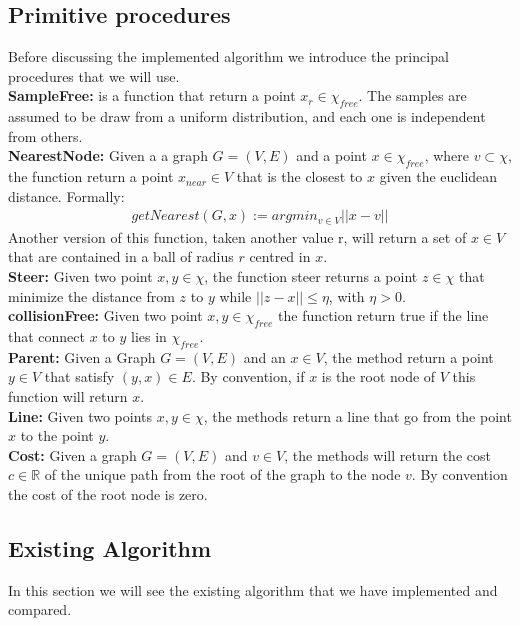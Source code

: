 \documentclass[10pt]{article}
\begin{document}
	\subsection{Primitive procedures}
	Before discussing the implemented algorithm we introduce the principal procedures that we will use.\\
	
	\textbf{SampleFree:} is a function that return a point $x_{r} \in \chi_{free}$. The samples are assumed to be draw from a uniform distribution, and each one is independent from others.\\
	
	
	\textbf{NearestNode:} Given a a graph $G=(V,E)$ and a point $x\in\chi_{free}$, where $v\subset\chi$, the function return a point $x_{near} \in V$ that is the closest to $x$ given the euclidean distance. Formally: 
	\begin{align}
    getNearest (G,x) := argmin_{v \in V} ||x - v|| \nonumber
	\end{align}
	Another version of this function, taken another value r, will return a set of $x\in V$ that are contained in a ball of radius $r$ centred in $x$.\\  
	
	\textbf{Steer:} Given two point $x,y \in \chi$, the function steer returns a point $z \in \chi$ that minimize the distance from $z$ to $y$ while $||z-x|| \le \eta$, with $\eta > 0$. \\
	
	\textbf{collisionFree:} Given two point $x,y \in \chi_{free}$ the function return true if the line that connect $x$ to $y$ lies in $\chi_{free}$.\\
	
	\textbf{Parent:} Given a Graph $G=(V,E)$ and an $x\in V$, the method return a point $y \in V$ that satisfy $(y,x) \in E$. By convention, if $x$ is the root node of $V$ this function will return $x$.\\
	
	\textbf{Line:} Given two points $x,y \in \chi$, the methods return a line that go from the point $x$ to the point $y$.\\
	
	\textbf{Cost:} Given a graph $G=(V,E)$ and $v \in V$, the methods will return the cost $c \in\mathbb{R}$ of the unique path from the root of the graph to the node $v$. By convention the cost of the root node is zero.\\

	\subsection{Existing Algorithm}
	In this section we will see the existing algorithm that we have implemented and compared.
	
\end{document}
